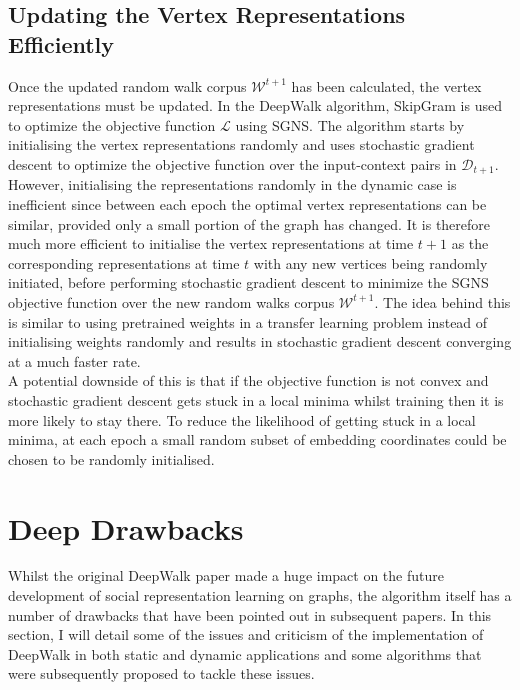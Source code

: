 \documentclass[a4paper]{article}
\newcommand{\D}{\mathcal D}
\newcommand{\W}{\mathcal W}
\begin{document}
\subsection{Updating the Vertex Representations Efficiently}
Once the updated random walk corpus $\W^{t+1}$ has been calculated, the vertex
representations must be updated. In the DeepWalk algorithm, SkipGram is used to
optimize the objective function $\mathcal{L}$ using SGNS.
The algorithm starts by initialising the vertex representations randomly and
uses stochastic gradient descent to optimize the objective function over the
input-context pairs in $\D_{t+1}$.\\
However, initialising the representations randomly in the dynamic case is
inefficient since between each epoch the optimal vertex representations can be similar, provided only a small portion of the graph has changed. It is therefore much more efficient to initialise the vertex
representations at time $t+1$ as the corresponding representations at time $t$
with any new vertices being randomly initiated, before performing stochastic gradient
descent to minimize the SGNS objective function over the new random walks corpus
$\W^{t+1}$. The idea behind this is similar to using pretrained weights in a transfer
learning problem instead of initialising weights randomly and results in
stochastic gradient descent converging at a much faster rate.\\
A potential downside of this is that if the objective function is not convex and
stochastic gradient descent gets stuck in a local minima whilst training then it
is more likely to stay there. To reduce the likelihood of getting stuck in a local
minima, at each epoch a small random subset of embedding coordinates could be chosen to be randomly initialised.

\section{Deep Drawbacks}
Whilst the original DeepWalk paper made a huge impact on the future development
of social representation learning on graphs, the algorithm itself has a number
of drawbacks that have been pointed out in subsequent papers. In this section, I will detail some of the issues and criticism of the implementation of
DeepWalk in both static and dynamic applications and some algorithms that were subsequently proposed to tackle these issues.\\
\end{document}
